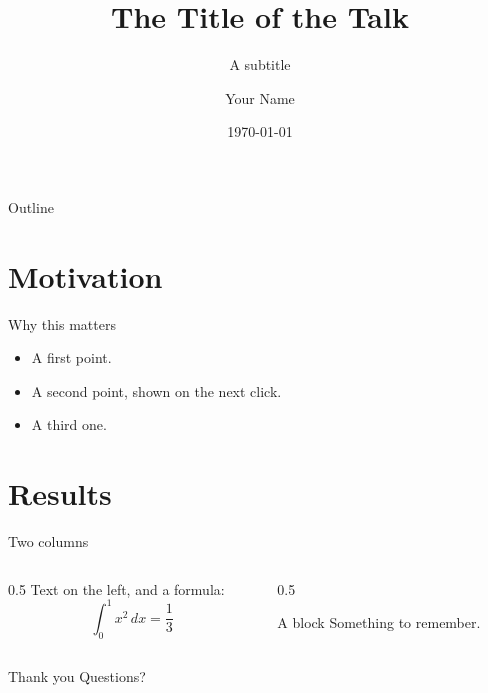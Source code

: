 \documentclass[aspectratio=169]{beamer}
\title{The Title of the Talk}
\subtitle{A subtitle}
\author{Your Name}
\institute{Your Institution}
\date{\today}
\begin{document}
\begin{frame}
  \titlepage
\end{frame}

\begin{frame}{Outline}
  \tableofcontents
\end{frame}

\section{Motivation}
\begin{frame}{Why this matters}
  \begin{itemize}
    \item<1-> A first point.
    \item<2-> A second point, shown on the next click.
    \item<3-> A third one.
  \end{itemize}
\end{frame}

\section{Results}
\begin{frame}{Two columns}
  \begin{columns}
    \begin{column}{0.5\textwidth}
      Text on the left, and a formula:
      \[ \int_0^1 x^2 \, dx = \frac{1}{3} \]
    \end{column}
    \begin{column}{0.5\textwidth}
      \begin{block}{A block}
        Something to remember.
      \end{block}
    \end{column}
  \end{columns}
\end{frame}

\begin{frame}{Thank you}
  \centering Questions?
\end{frame}
\end{document}
